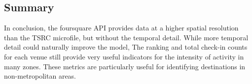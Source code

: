 

\subsection{Summary}
In conclusion, the foursquare API provides data at a higher spatial resolution than the TSRC microfile, but without the temporal detail. While more temporal detail could naturally improve the model, The ranking and total check-in counts for each venue still provide very useful indicators for the intensity of activity in many zones. These metrics are particularly useful for identifying destinations in non-metropolitan areas.